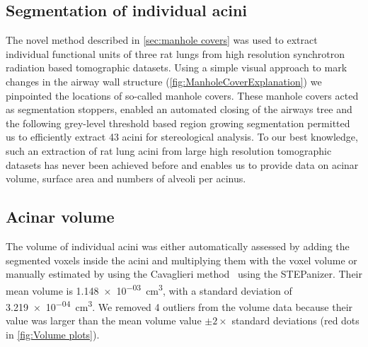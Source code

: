 \documentclass[a4paper,DIV=calc,abstract,english]{scrartcl}
\newcommand{\numberofacini}{43}
\newcommand{\numberofoutliers}{4} %
\newcommand{\biggerthan}{2} %
\newcommand{\meanacinarvolume}{1.148e-03} %
\newcommand{\std}{3.219e-04} %
\begin{document}
\subsection{Segmentation of individual acini}
The novel method described in \autoref{sec:manhole covers} was used to extract individual functional units of three rat lungs from high resolution synchrotron radiation based tomographic datasets.
Using a simple visual approach to mark changes in the airway wall structure (\autoref{fig:ManholeCoverExplanation}) we pinpointed the locations of  so-called manhole covers.
These manhole covers acted as segmentation stoppers, enabled an automated closing of the airways tree and the following grey-level threshold based region growing segmentation permitted us to efficiently extract \numberofacini\xspace acini for stereological analysis.
To our best knowledge, such an extraction of rat lung acini from large high resolution tomographic datasets has never been achieved before and enables us to provide data on acinar volume, surface area and numbers of alveoli per acinus.

\subsection{Acinar volume}
The volume of individual acini was either automatically assessed by adding the segmented voxels inside the acini and multiplying them with the voxel volume or manually estimated by using the Cavaglieri method~\cite{Hsia2010} using the STEPanizer.
Their mean volume is \SI{\meanacinarvolume}{\centi\metre\cubed}, with a standard deviation of \SI{\std}{\centi\metre\cubed}. We removed \numberofoutliers\xspace outliers from the volume data because their value was larger than the mean volume value \(\pm\biggerthan\times\) standard deviations (red dots in \autoref{fig:Volume plots}).
\end{document}
